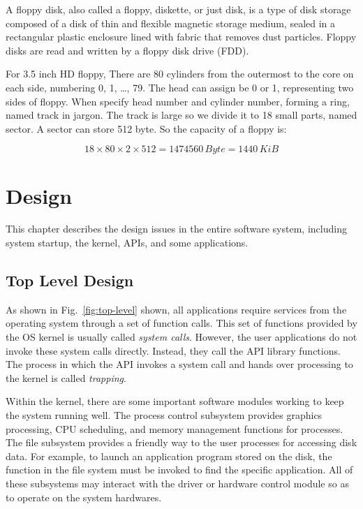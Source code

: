 \documentclass{swfcthesis}
\begin{document}
A floppy disk, also called a floppy, diskette, or just disk, is a type of disk storage
composed of a disk of thin and flexible magnetic storage medium, sealed in a rectangular
plastic enclosure lined with fabric that removes dust particles. Floppy disks are read and
written by a floppy disk drive (FDD)\cite{wiki:floppy}.

For 3.5 inch HD floppy,  There are 80 cylinders from the outermost to
the core on each side, numbering 0, 1, \ldots, 79. The head can assign be 0 or 1,
representing two sides of floppy. When specify head number and cylinder number, forming a
ring, named track in jargon. The track is large so we divide it to 18 small parts, named
sector. A sector can store 512 byte. So the capacity of a floppy is:

\[18 \times 80 \times 2 \times 512 = 1474560\,Byte = 1440\,KiB\]

\fi %


\chapter{Design}

This chapter describes the design issues in the entire software system, including system startup,
the kernel, APIs, and some applications.


\section{Top Level Design}

As shown in Fig.~\ref{fig:top-level} shown, all applications
require services from the
operating system through a set of function calls. This set of functions provided by the OS
kernel is usually called \emph{system calls}. However, the user applications do not invoke
these system calls directly. Instead, they call the API library functions. The process in
which the API invokes a system call and hands over processing to the kernel is called
\emph{trapping}.

Within the kernel, there are some important software modules working to keep the system
running well. The process control subsystem provides graphics processing, CPU scheduling,
and memory management functions for processes. The file
subsystem provides a friendly way to the user processes for accessing disk data. For
example, to launch an application program stored on the disk, the function in the file
system must be invoked to find the specific application. All of these subsystems may
interact with the driver or hardware control module so as to operate on the system
hardwares.
\end{document}
